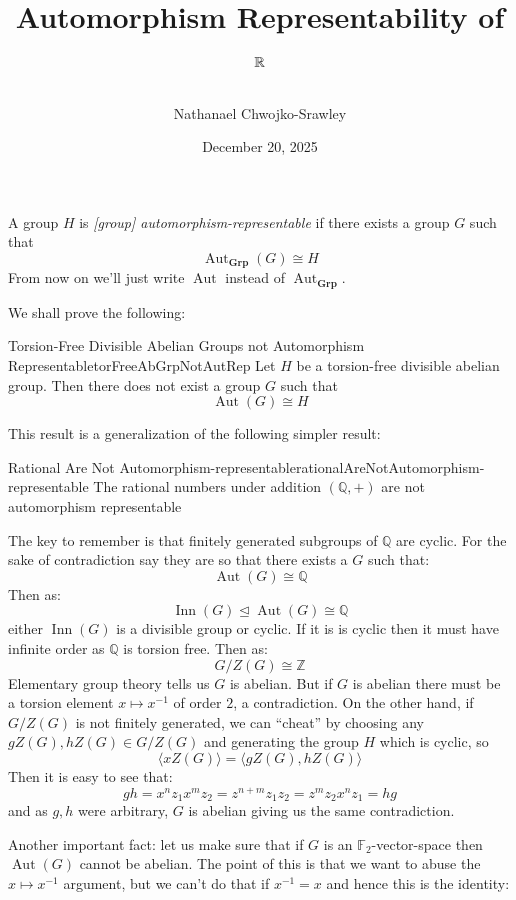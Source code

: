 \documentclass{book}
\title{
	\begin{huge}
		\bf{Automorphism Representability of ${\mathbb{R}}$}
	\end{huge}
	}
\date{December 20, 2025}
\author{Nathanael Chwojko-Srawley}
\newcommand{\F}{{\mathbb{F}}}
\newcommand{\Q}{{\mathbb{Q}}}
\newcommand{\Z}{{\mathbb{Z}}}
\newcommand{\Grp}{{\textbf{Grp}}}
\newcommand{\Aut}{{\operatorname{Aut}}}
\newcommand{\Inn}{{\operatorname{Inn}}}
\newcommand{\nsubg}{\trianglelefteq}
\newenvironment{Proof}[1][]
  {\begin{ProofTcb}[#1]}
  {\end{ProofTcb}}
\begin{document}
\maketitle

A group $H$ is \emph{[group] automorphism-representable} if there exists a group $G$ such that
\[
  \Aut_\Grp(G) \cong H
\]
From now on we'll just write $\Aut$ instead of $\Aut_\Grp$.

We shall prove the following:
\begin{thm}{Torsion-Free Divisible Abelian Groups not Automorphism Representable}{torFreeAbGrpNotAutRep}
  Let $H$ be a torsion-free divisible abelian group. Then there does not exist a group $G$ such that
  \[
    \Aut(G) \cong H
  \]
\end{thm}

This result is a generalization of the following simpler result:

\begin{lem}{Rational Are Not Automorphism-representable}{rationalAreNotAutomorphism-representable}
  The rational numbers under addition $(\Q, +)$ are not automorphism representable
\end{lem}

\begin{Proof}
  The key to remember is that finitely generated subgroups of $\Q$ are cyclic.
  For the sake of contradiction say they are so that there exists a $G$ such that:
  \[
    \Aut(G) \cong \Q
  \]
  Then as:
  \[
    \Inn(G) \nsubg \Aut(G) \cong \Q
  \]
  either $\Inn(G)$ is a divisible group or cyclic. If it is is cyclic then it must have infinite order as $\Q$
  is torsion free. Then as:
  \[
    G/Z(G) \cong \Z
  \]
  Elementary group theory tells us $G$ is abelian. But if $G$ is abelian there must be a torsion element
  $x \mapsto x^{-1}$ of order $2$, a contradiction. On the other hand, if $G/Z(G)$ is not finitely generated,
  we can ``cheat'' by choosing any $gZ(G), hZ(G) \in G/Z(G)$ and generating the group $H$ which is cyclic, so
  \[
    \langle xZ(G) \rangle = \langle gZ(G), hZ(G) \rangle
  \]
  Then it is easy to see that:
  \[
    gh = x^nz_1x^mz_2 = z^{n+m}z_1z_2 = z^mz_2x^nz_1 = hg
  \]
  and as $g,h$ were arbitrary, $G$ is abelian giving us the same contradiction.
\end{Proof}

Another important fact: let us make sure that if $G$ is an $\F_2$-vector-space then $\Aut(G)$ cannot be
abelian. The point of this is that we want to abuse the $x \mapsto x^{-1}$ argument, but we can't do that if
$x^{-1} = x$ and hence this is the identity:
\end{document}
